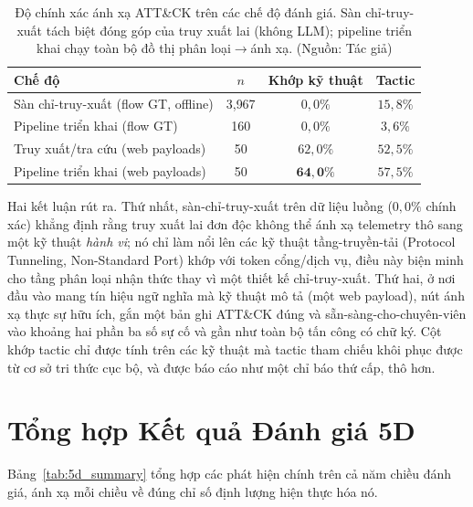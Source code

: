 \begin{table}[!htbp]
    \centering
    \footnotesize
    \caption{Độ chính xác ánh xạ ATT\&CK trên các chế độ đánh giá. Sàn chỉ-truy-xuất tách biệt đóng góp của truy xuất lai (không LLM); pipeline triển khai chạy toàn bộ đồ thị phân loại$\rightarrow$ánh xạ. (Nguồn: Tác giả)}
    \label{tab:attack_mapper}
    \begin{tabular}{|>{\raggedright\arraybackslash}p{}|c|c|c|}
        \hline
        \textbf{Chế độ} & \textbf{$n$} & \textbf{Khớp kỹ thuật} & \textbf{Tactic} \\
        \hline
        Sàn chỉ-truy-xuất (flow GT, offline) & 3{,}967 & $0{,}0\%$ & $15{,}8\%$ \\
        \hline
        Pipeline triển khai (flow GT) & 160 & $0{,}0\%$ & $3{,}6\%$ \\
        \hline
        Truy xuất/tra cứu (web payloads) & 50 & $62{,}0\%$ & $52{,}5\%$ \\
        \hline
        Pipeline triển khai (web payloads) & 50 & $\mathbf{64{,}0\%}$ & $57{,}5\%$ \\
        \hline
    \end{tabular}
\end{table}

Hai kết luận rút ra. Thứ nhất, sàn-chỉ-truy-xuất trên dữ liệu luồng ($0{,}0\%$ chính xác) khẳng định rằng truy xuất lai đơn độc không thể ánh xạ telemetry thô sang một kỹ thuật \emph{hành vi}; nó chỉ làm nổi lên các kỹ thuật tầng-truyền-tải (Protocol Tunneling, Non-Standard Port) khớp với token cổng/dịch vụ, điều này biện minh cho tầng phân loại nhận thức thay vì một thiết kế chỉ-truy-xuất. Thứ hai, ở nơi đầu vào mang tín hiệu ngữ nghĩa mà kỹ thuật mô tả (một web payload), nút ánh xạ thực sự hữu ích, gắn một bản ghi ATT\&CK đúng và sẵn-sàng-cho-chuyên-viên vào khoảng hai phần ba số sự cố và gần như toàn bộ tấn công có chữ ký. Cột khớp tactic chỉ được tính trên các kỹ thuật mà tactic tham chiếu khôi phục được từ cơ sở tri thức cục bộ, và được báo cáo như một chỉ báo thứ cấp, thô hơn.

\section{Tổng hợp Kết quả Đánh giá 5D}
Bảng~\ref{tab:5d_summary} tổng hợp các phát hiện chính trên cả năm chiều đánh giá, ánh xạ mỗi chiều về đúng chỉ số định lượng hiện thực hóa nó.

